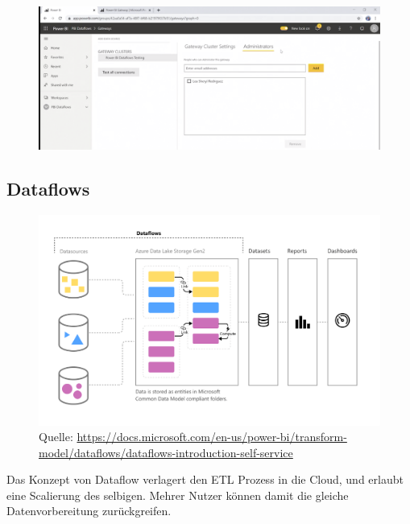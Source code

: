 \begin{figure}[H]
	\centering
	\includegraphics[scale = 0.3]{attachment/chapter_1/Scc136}
\end{figure}

\subsection{Dataflows}

\begin{figure}[H]
	\centering
	\includegraphics[scale=0.3]{attachment/chapter_1/Scc137}
	\caption{Quelle: \href{doc}{https://docs.microsoft.com/en-us/power-bi/transform-model/dataflows/dataflows-introduction-self-service}}
\end{figure}
Das Konzept von Dataflow verlagert den \gls{ETL} Prozess in die Cloud, und erlaubt eine Scalierung des selbigen. Mehrer Nutzer können damit die gleiche Datenvorbereitung zurückgreifen. 

